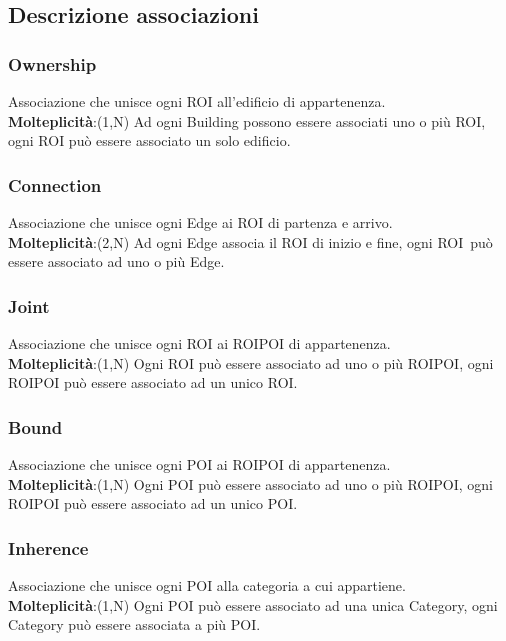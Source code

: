 \documentclass[../ManualeSviluppatore.tex]{subfiles}
\begin{document}
	\subsection{Descrizione associazioni}
		\subsubsection{Ownership}
			Associazione che unisce ogni \gls{ROI} all'edificio di appartenenza.\\
			\textbf{Molteplicità}:(1,N) Ad ogni Building possono essere associati uno o più \gls{ROI}, ogni \gls{ROI} può essere associato un solo edificio.

		\subsubsection{Connection}
			Associazione che unisce ogni Edge ai \gls{ROI} di partenza e arrivo. \\
			\textbf{Molteplicità}:(2,N) Ad ogni Edge associa il \gls{ROI} di inizio e fine, ogni \gls{ROI}\ 
può essere associato ad uno o più Edge.

		\subsubsection{Joint}
			Associazione che unisce ogni \gls{ROI} ai ROIPOI di appartenenza. \\
			\textbf{Molteplicità}:(1,N) Ogni \gls{ROI} può essere associato ad uno o più ROIPOI, ogni ROIPOI può essere associato ad un unico \gls{ROI}.

		\subsubsection{Bound}
			Associazione che unisce ogni \gls{POI} ai ROIPOI di appartenenza. \\
			\textbf{Molteplicità}:(1,N) Ogni \gls{POI} può essere associato ad uno o più ROIPOI, ogni ROIPOI può essere associato ad un unico \gls{POI}.

		\subsubsection{Inherence}
			Associazione che unisce ogni \gls{POI} alla categoria a cui appartiene.\\
			\textbf{Molteplicità}:(1,N) Ogni \gls{POI} può essere associato ad una unica Category, ogni Category può essere associata a più \gls{POI}.
\end{document}
